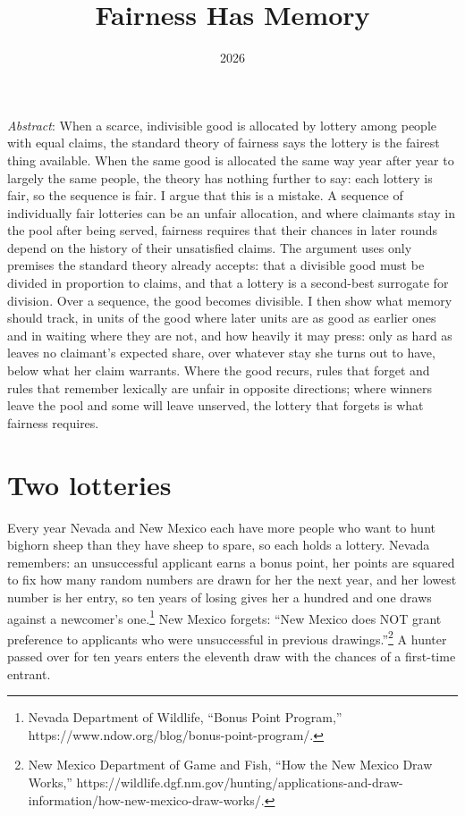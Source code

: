 \documentclass[
  11pt,
  letterpaper,
  DIV=11,
  numbers=noendperiod,
  twoside]{scrartcl}
\title{Fairness Has Memory}
\author{}
\date{2026}
\renewenvironment{abstract}
 {\vspace{-1.25cm}
 \quotation\small\noindent\emph{Abstract}:}
 {\endquotation}
\renewenvironment{abstract}
 {\quotation\small\noindent\emph{Abstract}:}
 {\endquotation\vspace{-0.02cm}}
\begin{document}
\maketitle
\begin{abstract}
When a scarce, indivisible good is allocated by lottery among people
with equal claims, the standard theory of fairness says the lottery is
the fairest thing available. When the same good is allocated the same
way year after year to largely the same people, the theory has nothing
further to say: each lottery is fair, so the sequence is fair. I argue
that this is a mistake. A sequence of individually fair lotteries can be
an unfair allocation, and where claimants stay in the pool after being
served, fairness requires that their chances in later rounds depend on
the history of their unsatisfied claims. The argument uses only premises
the standard theory already accepts: that a divisible good must be
divided in proportion to claims, and that a lottery is a second-best
surrogate for division. Over a sequence, the good becomes divisible. I
then show what memory should track, in units of the good where later
units are as good as earlier ones and in waiting where they are not, and
how heavily it may press: only as hard as leaves no claimant's expected
share, over whatever stay she turns out to have, below what her claim
warrants. Where the good recurs, rules that forget and rules that
remember lexically are unfair in opposite directions; where winners
leave the pool and some will leave unserved, the lottery that forgets is
what fairness requires.
\end{abstract}


\section{Two lotteries}\label{sec-intro}

Every year Nevada and New Mexico each have more people who want to hunt
bighorn sheep than they have sheep to spare, so each holds a lottery.
Nevada remembers: an unsuccessful applicant earns a bonus point, her
points are squared to fix how many random numbers are drawn for her the
next year, and her lowest number is her entry, so ten years of losing
gives her a hundred and one draws against a newcomer's one.\footnote{Nevada
  Department of Wildlife, ``Bonus Point Program,''
  https://www.ndow.org/blog/bonus-point-program/.} New Mexico forgets:
``New Mexico does NOT grant preference to applicants who were
unsuccessful in previous drawings.''\footnote{New Mexico Department of
  Game and Fish, ``How the New Mexico Draw Works,''
  https://wildlife.dgf.nm.gov/hunting/applications-and-draw-information/how-new-mexico-draw-works/.}
A hunter passed over for ten years enters the eleventh draw with the
chances of a first-time entrant.
\end{document}
